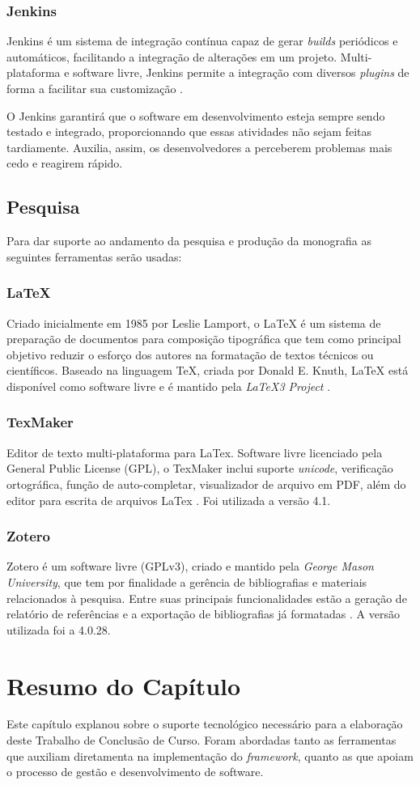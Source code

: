 \subsubsection{Jenkins}
Jenkins é um sistema de integração contínua capaz de gerar \textit{builds} periódicos e automáticos, facilitando a integração de alterações em um projeto. Multi-plataforma e software livre, Jenkins permite a integração com diversos \textit{plugins} de forma a facilitar sua customização \cite{jenkins2015}.
\par
\indent O Jenkins garantirá que o software em desenvolvimento esteja sempre sendo testado e integrado, proporcionando que essas atividades não sejam feitas tardiamente. Auxilia, assim, os desenvolvedores a perceberem problemas mais cedo e reagirem rápido.

\subsection{Pesquisa}
Para dar suporte ao andamento da pesquisa e produção da monografia as seguintes ferramentas serão usadas:

\subsubsection{LaTeX}
Criado inicialmente em 1985 por Leslie Lamport, o LaTeX é um sistema de preparação de documentos para composição tipográfica que tem como principal objetivo reduzir o esforço dos autores na formatação de textos técnicos ou científicos. Baseado na linguagem TeX, criada por Donald E. Knuth, LaTeX está disponível como software livre e é mantido pela \textit{LaTeX3 Project} \cite{latex2015}.

\subsubsection{TexMaker}
Editor de texto multi-plataforma para LaTex. Software livre licenciado pela General Public License (GPL), o TexMaker inclui suporte \textit{unicode}, verificação ortográfica, função de auto-completar, visualizador de arquivo em PDF, além do editor para escrita de arquivos LaTex \cite{texmaker2014}. Foi utilizada a versão 4.1.

\subsubsection{Zotero}
Zotero é um software livre (GPLv3), criado e mantido pela \textit{George Mason University}, que tem por finalidade a gerência de bibliografias e materiais relacionados à pesquisa. Entre suas principais funcionalidades estão a geração de relatório de referências e a exportação de bibliografias já formatadas \cite{zotero2015}. A versão utilizada foi a 4.0.28.

\section{Resumo do Capítulo}
Este capítulo explanou sobre o suporte tecnológico necessário para a elaboração deste Trabalho de Conclusão de Curso. Foram abordadas tanto as ferramentas que auxiliam diretamenta na implementação do \textit{framework}, quanto as que apoiam o processo de gestão e desenvolvimento de software.
